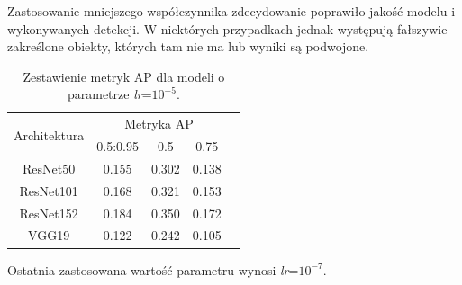 \hspace{0.5cm}
Zastosowanie mniejszego współczynnika zdecydowanie poprawiło jakość modelu i wykonywanych detekcji. W niektórych przypadkach jednak występują fałszywie zakreślone obiekty, których tam nie ma lub wyniki są podwojone.
\begin{table}[H]
    \centering
        \caption{Zestawienie metryk AP dla modeli o parametrze \emph{lr}=$10^{-5}$.}
    \begin{tabular}{|c||c|c|c|c|}
    \hline
        \multirow{2}{*}{Architektura}&\multicolumn{3}{c|}{Metryka AP}\\ \cline{2-4}
         & 0.5:0.95&0.5&0.75\\ \hline \hline
        ResNet50 & 0.155 & 0.302 & 0.138 \\ \hline
        ResNet101 & 0.168 & 0.321 & 0.153 \\ \hline
        ResNet152 & 0.184 & 0.350 & 0.172 \\ \hline
        VGG19 & 0.122 & 0.242 & 0.105 \\ \hline
    \end{tabular}
    \label{tab:ap_lr5}
\end{table}

\hspace{0.5cm}
Ostatnia zastosowana wartość parametru wynosi \emph{lr}=$10^{-7}$.

